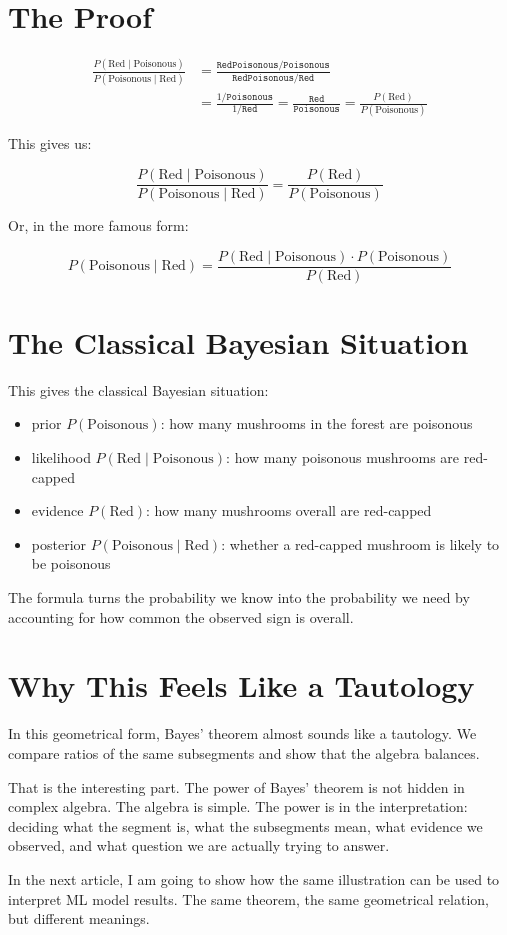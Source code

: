 \documentclass[11pt]{article}
\newcommand{\code}[1]{\texttt{#1}}
\begin{document}
\section*{The Proof}

\begin{align*}
\frac{P(\text{Red}\mid\text{Poisonous})}{P(\text{Poisonous}\mid\text{Red})}
&= \frac{\code{RedPoisonous} / \code{Poisonous}}{\code{RedPoisonous} / \code{Red}} \\
&= \frac{1 / \code{Poisonous}}{1 / \code{Red}}
= \frac{\code{Red}}{\code{Poisonous}}
= \frac{P(\text{Red})}{P(\text{Poisonous})}
\end{align*}

This gives us:

\[
\frac{P(\text{Red}\mid\text{Poisonous})}{P(\text{Poisonous}\mid\text{Red})} =
\frac{P(\text{Red})}{P(\text{Poisonous})}
\]

Or, in the more famous form:

\[
P(\text{Poisonous}\mid\text{Red}) =
\frac{P(\text{Red}\mid\text{Poisonous}) \cdot P(\text{Poisonous})}{P(\text{Red})}
\]

\section*{The Classical Bayesian Situation}

This gives the classical Bayesian situation:

\begin{itemize}
  \item prior $P(\text{Poisonous})$: how many mushrooms in the forest are poisonous
  \item likelihood $P(\text{Red}\mid\text{Poisonous})$: how many poisonous mushrooms are red-capped
  \item evidence $P(\text{Red})$: how many mushrooms overall are red-capped
  \item posterior $P(\text{Poisonous}\mid\text{Red})$: whether a red-capped mushroom is likely to be poisonous
\end{itemize}

The formula turns the probability we know into the probability we need by accounting for how common the observed sign is overall.

\section*{Why This Feels Like a Tautology}

In this geometrical form, Bayes' theorem almost sounds like a tautology. We compare ratios of the same subsegments and show that the algebra balances.

That is the interesting part. The power of Bayes' theorem is not hidden in complex algebra. The algebra is simple. The power is in the interpretation: deciding what the segment is, what the subsegments mean, what evidence we observed, and what question we are actually trying to answer.

In the next article, I am going to show how the same illustration can be used to interpret ML model results. The same theorem, the same geometrical relation, but different meanings.
\end{document}
